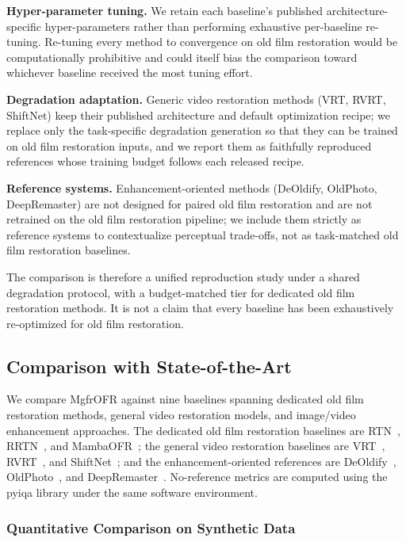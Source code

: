 \textbf{Hyper-parameter tuning.} We retain each baseline's published architecture-specific hyper-parameters rather than performing exhaustive per-baseline re-tuning. Re-tuning every method to convergence on old film restoration would be computationally prohibitive and could itself bias the comparison toward whichever baseline received the most tuning effort.

\textbf{Degradation adaptation.} Generic video restoration methods (VRT, RVRT, ShiftNet) keep their published architecture and default optimization recipe; we replace only the task-specific degradation generation so that they can be trained on old film restoration inputs, and we report them as faithfully reproduced references whose training budget follows each released recipe.

\textbf{Reference systems.} Enhancement-oriented methods (DeOldify, OldPhoto, DeepRemaster) are not designed for paired old film restoration and are not retrained on the old film restoration pipeline; we include them strictly as reference systems to contextualize perceptual trade-offs, not as task-matched old film restoration baselines.

The comparison is therefore a unified reproduction study under a shared degradation protocol, with a budget-matched tier for dedicated old film restoration methods. It is not a claim that every baseline has been exhaustively re-optimized for old film restoration.

\subsection{Comparison with State-of-the-Art}
\label{subsec:comparison_sota}

We compare MgfrOFR against nine baselines spanning dedicated old film restoration methods, general video restoration models, and image/video enhancement approaches. The dedicated old film restoration baselines are RTN~\cite{wan2022rtn}, RRTN~\cite{lin2024rrtn}, and MambaOFR~\cite{mao2025mambaofr}; the general video restoration baselines are VRT~\cite{liang2024vrt}, RVRT~\cite{liang2022rvrt}, and ShiftNet~\cite{li2023shiftnet}; and the enhancement-oriented references are DeOldify~\cite{jantic2019deoldify}, OldPhoto~\cite{wan2023oldphotopami}, and DeepRemaster~\cite{iizuka2019deepremaster}. No-reference metrics are computed using the pyiqa library under the same software environment.

\subsubsection{Quantitative Comparison on Synthetic Data}

